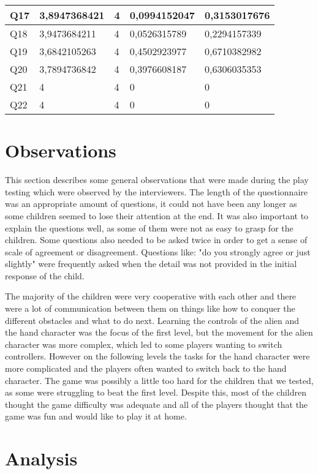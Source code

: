 \begin{table}[!ht]
\begin{tabular}{|l|l|l|l|l|}
		Q17               & 3,8947368421  & 4               & 0,0994152047      & 0,3153017676    \\ \hline
		Q18               & 3,9473684211  & 4               & 0,0526315789      & 0,2294157339    \\ \hline
		Q19               & 3,6842105263  & 4               & 0,4502923977      & 0,6710382982    \\ \hline
		Q20               & 3,7894736842  & 4               & 0,3976608187      & 0,6306035353    \\ \hline
		Q21               & 4             & 4               & 0                 & 0               \\ \hline
		Q22               & 4             & 4               & 0                 & 0               \\ \hline
	\end{tabular}
\end{table}


\section{Observations}
This section describes some general observations that were made during the play testing which were observed by the interviewers. The length of the questionnaire was an appropriate amount of questions, it could not have been any longer as some children seemed to lose their attention at the end. It was also important to explain the questions well, as some of them were not as easy to grasp for the children. Some questions also needed to be asked twice in order to get a sense of scale of agreement or disagreement. Questions like: "do you strongly agree or just slightly" were frequently asked when the detail was not provided in the initial response of the child. 

The majority of the children were very cooperative with each other and there were a lot of communication between them on things like how to conquer the different obstacles and what to do next. Learning the controls of the alien and the hand character was the focus of the first level, but the movement for the alien character was more complex, which led to some players wanting to switch controllers. However on the following levels the tasks for the hand character were more complicated and the players often wanted to switch back to the hand character. The game was possibly a little too hard for the children that we tested, as some were struggling to beat the first level.  Despite this, most of the children thought the game difficulty was adequate and all of the players thought that the game was fun and would like to play it at home.

\section{Analysis}
